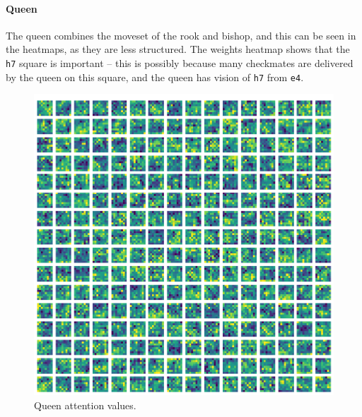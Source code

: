 \paragraph{Queen} The queen combines the moveset of the rook and bishop, and
this can be seen in the heatmaps, as they are less structured. The weights
heatmap shows that the \texttt{h7} square is important -- this is possibly
because many checkmates are delivered by the queen on this square, and the
queen has vision of \texttt{h7} from \texttt{e4}.

\begin{figure}[H]
  \begin{minipage}{0.475\textwidth}
    \centering
    \includegraphics[width=\textwidth]{project/img/attention_maps/Q_attention_6.png}
    \caption{Queen attention values.}
    \label{atnQ}
  \end{minipage}
  \hspace{0.05\textwidth}
  \begin{minipage}{0.475\textwidth}
    \centering

\end{minipage}
\end{figure}
